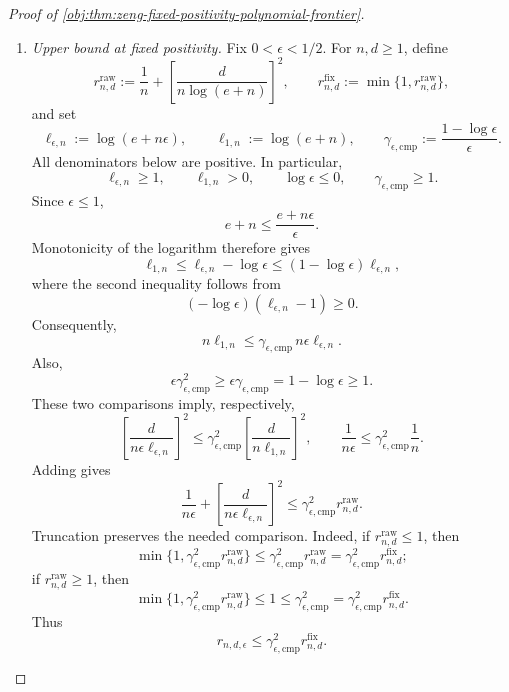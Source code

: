 \documentclass[11pt]{article}
\begin{document}
\begin{proof}[Proof of \cref{obj:thm:zeng-fixed-positivity-polynomial-frontier}]
\begin{enumerate}
\item \textit{Upper bound at fixed positivity.}
Fix \(0<\epsilon<1/2\). For \(n,d\ge1\), define
\[
r^{\mathrm{raw}}_{n,d}
:=
\frac1n+\left[\frac d{n\log(e+n)}\right]^2,
\qquad
r^{\mathrm{fix}}_{n,d}:=\min\{1,r^{\mathrm{raw}}_{n,d}\},
\]
and set
\[
\ell_{\epsilon,n}:=\log(e+n\epsilon),
\qquad
\ell_{1,n}:=\log(e+n),
\qquad
\gamma_{\epsilon,\mathrm{cmp}}
:=\frac{1-\log\epsilon}{\epsilon}.
\]
All denominators below are positive. In particular,
\[
\ell_{\epsilon,n}\ge1,
\qquad
\ell_{1,n}>0,
\qquad
\log\epsilon\le0,
\qquad
\gamma_{\epsilon,\mathrm{cmp}}\ge1.
\]
Since \(\epsilon\le1\),
\[
e+n\le\frac{e+n\epsilon}{\epsilon}.
\]
Monotonicity of the logarithm therefore gives
\[
\ell_{1,n}
\le \ell_{\epsilon,n}-\log\epsilon
\le (1-\log\epsilon)\ell_{\epsilon,n},
\]
where the second inequality follows from
\[
(-\log\epsilon)(\ell_{\epsilon,n}-1)\ge0.
\]
Consequently,
\[
n\ell_{1,n}
\le
\gamma_{\epsilon,\mathrm{cmp}}\,
n\epsilon\ell_{\epsilon,n}.
\]
Also,
\[
\epsilon\gamma_{\epsilon,\mathrm{cmp}}^2
\ge
\epsilon\gamma_{\epsilon,\mathrm{cmp}}
=
1-\log\epsilon
\ge1.
\]
These two comparisons imply, respectively,
\[
\left[\frac d{n\epsilon\ell_{\epsilon,n}}\right]^2
\le
\gamma_{\epsilon,\mathrm{cmp}}^2
\left[\frac d{n\ell_{1,n}}\right]^2,
\qquad
\frac1{n\epsilon}
\le
\gamma_{\epsilon,\mathrm{cmp}}^2\frac1n.
\]
Adding gives
\[
\frac1{n\epsilon}
+\left[\frac d{n\epsilon\ell_{\epsilon,n}}\right]^2
\le
\gamma_{\epsilon,\mathrm{cmp}}^2 r^{\mathrm{raw}}_{n,d}.
\]
Truncation preserves the needed comparison. Indeed, if
\(r^{\mathrm{raw}}_{n,d}\le1\), then
\[
\min\{1,\gamma_{\epsilon,\mathrm{cmp}}^2r^{\mathrm{raw}}_{n,d}\}
\le
\gamma_{\epsilon,\mathrm{cmp}}^2r^{\mathrm{raw}}_{n,d}
=
\gamma_{\epsilon,\mathrm{cmp}}^2r^{\mathrm{fix}}_{n,d};
\]
if \(r^{\mathrm{raw}}_{n,d}\ge1\), then
\[
\min\{1,\gamma_{\epsilon,\mathrm{cmp}}^2r^{\mathrm{raw}}_{n,d}\}
\le1
\le
\gamma_{\epsilon,\mathrm{cmp}}^2
=
\gamma_{\epsilon,\mathrm{cmp}}^2r^{\mathrm{fix}}_{n,d}.
\]
Thus
\[
r_{n,d,\epsilon}
\le
\gamma_{\epsilon,\mathrm{cmp}}^2r^{\mathrm{fix}}_{n,d}.
\]


\end{enumerate}
\end{proof}
\end{document}

